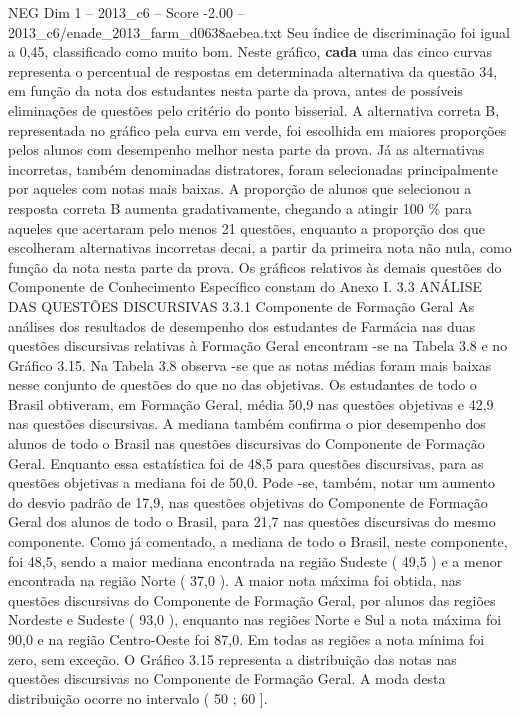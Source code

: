 \begin{textsample}{NEG Dim 1 – 2013\_c6 – Score -2.00 – 2013\_c6/enade\_2013\_farm\_d0638aebea.txt}
Seu índice de discriminação foi igual a 0,45, classificado como muito bom.
Neste gráfico, \textbf{cada} uma das cinco curvas representa o percentual de respostas em determinada alternativa da questão 34, em função da nota dos estudantes nesta parte da prova, antes de possíveis eliminações de questões pelo critério do ponto bisserial.
A alternativa correta B, representada no gráfico pela curva em verde, foi escolhida em maiores proporções pelos alunos com desempenho melhor nesta parte da prova.
Já as alternativas incorretas, também denominadas distratores, foram selecionadas principalmente por aqueles com notas mais baixas.
A proporção de alunos que selecionou a resposta correta B aumenta gradativamente, chegando a atingir 100 \% para aqueles que acertaram pelo menos 21 questões, enquanto a proporção dos que escolheram alternativas incorretas decai, a partir da primeira nota não nula, como função da nota nesta parte da prova.
Os gráficos relativos às demais questões do Componente de Conhecimento Específico constam do Anexo I. 3.3 ANÁLISE DAS QUESTÕES DISCURSIVAS 3.3.1 Componente de Formação Geral As análises dos resultados de desempenho dos estudantes de Farmácia nas duas questões discursivas relativas à Formação Geral encontram -se na Tabela 3.8 e no Gráfico 3.15.
Na Tabela 3.8 observa -se que as notas médias foram mais baixas nesse conjunto de questões do que no das objetivas.
Os estudantes de todo o Brasil obtiveram, em Formação Geral, média 50,9 nas questões objetivas e 42,9 nas questões discursivas.
A mediana também confirma o pior desempenho dos alunos de todo o Brasil nas questões discursivas do Componente de Formação Geral.
Enquanto essa estatística foi de 48,5 para questões discursivas, para as questões objetivas a mediana foi de 50,0.
Pode -se, também, notar um aumento do desvio padrão de 17,9, nas questões objetivas do Componente de Formação Geral dos alunos de todo o Brasil, para 21,7 nas questões discursivas do mesmo componente.
Como já comentado, a mediana de todo o Brasil, neste componente, foi 48,5, sendo a maior mediana encontrada na região Sudeste ( 49,5 ) e a menor encontrada na região Norte ( 37,0 ).
A maior nota máxima foi obtida, nas questões discursivas do Componente de Formação Geral, por alunos das regiões Nordeste e Sudeste ( 93,0 ), enquanto nas regiões Norte e Sul a nota máxima foi 90,0 e na região Centro-Oeste foi 87,0.
Em todas as regiões a nota mínima foi zero, sem exceção.
O Gráfico 3.15 representa a distribuição das notas nas questões discursivas no Componente de Formação Geral.
A moda desta distribuição ocorre no intervalo ( 50 ; 60 ].

\end{textsample}

